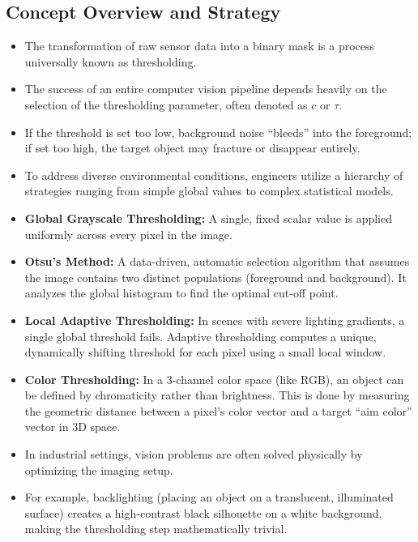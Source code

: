 \documentclass[12pt]{article}
\begin{document}
\subsection{Concept Overview and Strategy}
\begin{itemize}
    \item The transformation of raw sensor data into a binary mask is a process universally known as thresholding.

    \item The success of an entire computer vision pipeline depends heavily on the selection of the thresholding parameter, often denoted as $c$ or $\tau$.

    \item If the threshold is set too low, background noise ``bleeds'' into the foreground; if set too high, the target object may fracture or disappear entirely.

    \item To address diverse environmental conditions, engineers utilize a hierarchy of strategies ranging from simple global values to complex statistical models.

    \item \textbf{Global Grayscale Thresholding:} A single, fixed scalar value is applied uniformly across every pixel in the image.

    \item \textbf{Otsu’s Method:} A data-driven, automatic selection algorithm that assumes the image contains two distinct populations (foreground and background). It analyzes the global histogram to find the optimal cut-off point.

    \item \textbf{Local Adaptive Thresholding:} In scenes with severe lighting gradients, a single global threshold fails. Adaptive thresholding computes a unique, dynamically shifting threshold for each pixel using a small local window.

    \item \textbf{Color Thresholding:} In a 3-channel color space (like RGB), an object can be defined by chromaticity rather than brightness. This is done by measuring the geometric distance between a pixel’s color vector and a target ``aim color'' vector in 3D space.

    \item In industrial settings, vision problems are often solved physically by optimizing the imaging setup.

    \item For example, backlighting (placing an object on a translucent, illuminated surface) creates a high-contrast black silhouette on a white background, making the thresholding step mathematically trivial.
\end{itemize}
\end{document}
